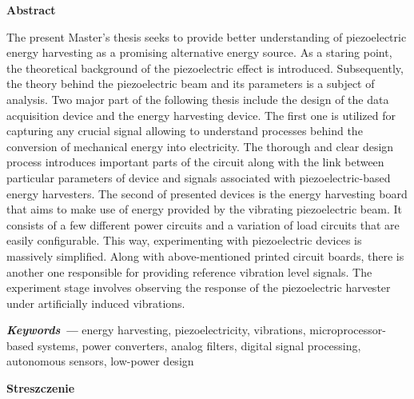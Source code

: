 \documentclass[12pt,a4paper]{article}
\providecommand{\keywords}[1]
{
  \small	
  \textbf{\textit{Keywords ---}} #1
}
\begin{document}
\newpage\null\thispagestyle{empty}\newpage

\begin{center}
\textbf{Abstract}
\hspace{10pt}
\end{center}

The present Master's thesis seeks to provide better understanding of piezoelectric energy harvesting as a promising alternative energy source. As a staring point, the theoretical background of the piezoelectric effect is introduced. Subsequently, the theory behind the piezoelectric beam and its parameters is a subject of analysis. Two major part of the following thesis include the design of the data acquisition device and the energy harvesting device. The first one is utilized for capturing any crucial signal allowing to understand processes behind the conversion of mechanical energy into electricity. The thorough and clear design process introduces important parts of the circuit along with the link between particular parameters of device and signals associated with piezoelectric-based energy harvesters. The second of presented devices is the energy harvesting board that aims to make use of energy provided by the vibrating piezoelectric beam. It consists of a few different power circuits and a variation of load circuits that are easily configurable. This way, experimenting with piezoelectric devices is massively simplified. Along with above-mentioned printed circuit boards, there is another one responsible for providing reference vibration level signals. The experiment stage involves observing the response of the piezoelectric harvester under artificially induced vibrations.

\par

\hspace{10pt}

\keywords{energy harvesting, piezoelectricity, vibrations, microprocessor-based systems, power converters, analog filters, digital signal processing, autonomous sensors, low-power design}

\begin{center}
\textbf{Streszczenie}
\hspace{10pt}
\end{center}
\end{document}
